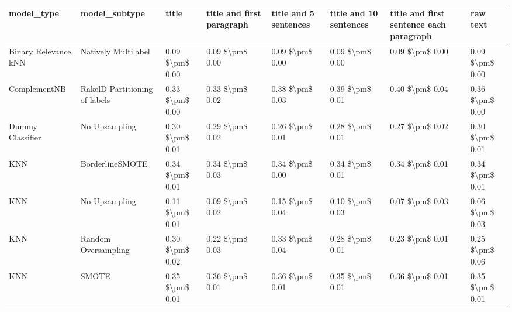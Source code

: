 \begin{tabular}{llllllll}
\toprule
                     model\_type &                 model\_subtype &           title & title and first paragraph & title and 5 sentences & title and 10 sentences & title and first sentence each paragraph &            raw text \\
\midrule
           Binary Relevance kNN &           Natively Multilabel & 0.09 \$\textbackslash pm\$ 0.00 &           0.09 \$\textbackslash pm\$ 0.00 &       0.09 \$\textbackslash pm\$ 0.00 &        0.09 \$\textbackslash pm\$ 0.00 &                         0.09 \$\textbackslash pm\$ 0.00 &     0.09 \$\textbackslash pm\$ 0.00 \\
                   ComplementNB & RakelD Partitioning of labels & 0.33 \$\textbackslash pm\$ 0.00 &           0.33 \$\textbackslash pm\$ 0.02 &       0.38 \$\textbackslash pm\$ 0.03 &        0.39 \$\textbackslash pm\$ 0.01 &                         0.40 \$\textbackslash pm\$ 0.04 &     0.36 \$\textbackslash pm\$ 0.00 \\
               Dummy Classifier &                 No Upsampling & 0.30 \$\textbackslash pm\$ 0.01 &           0.29 \$\textbackslash pm\$ 0.02 &       0.26 \$\textbackslash pm\$ 0.01 &        0.28 \$\textbackslash pm\$ 0.01 &                         0.27 \$\textbackslash pm\$ 0.02 &     0.30 \$\textbackslash pm\$ 0.01 \\
                            KNN &               BorderlineSMOTE & 0.34 \$\textbackslash pm\$ 0.01 &           0.34 \$\textbackslash pm\$ 0.03 &       0.34 \$\textbackslash pm\$ 0.00 &        0.34 \$\textbackslash pm\$ 0.01 &                         0.34 \$\textbackslash pm\$ 0.01 &     0.34 \$\textbackslash pm\$ 0.01 \\
                            KNN &                 No Upsampling & 0.11 \$\textbackslash pm\$ 0.01 &           0.09 \$\textbackslash pm\$ 0.02 &       0.15 \$\textbackslash pm\$ 0.04 &        0.10 \$\textbackslash pm\$ 0.03 &                         0.07 \$\textbackslash pm\$ 0.03 &     0.06 \$\textbackslash pm\$ 0.03 \\
                            KNN &           Random Oversampling & 0.30 \$\textbackslash pm\$ 0.02 &           0.22 \$\textbackslash pm\$ 0.03 &       0.33 \$\textbackslash pm\$ 0.04 &        0.28 \$\textbackslash pm\$ 0.01 &                         0.23 \$\textbackslash pm\$ 0.01 &     0.25 \$\textbackslash pm\$ 0.06 \\
                            KNN &                         SMOTE & 0.35 \$\textbackslash pm\$ 0.01 &           0.36 \$\textbackslash pm\$ 0.01 &       0.36 \$\textbackslash pm\$ 0.01 &        0.35 \$\textbackslash pm\$ 0.01 &                         0.36 \$\textbackslash pm\$ 0.01 &     0.35 \$\textbackslash pm\$ 0.01 \\

\end{tabular}
